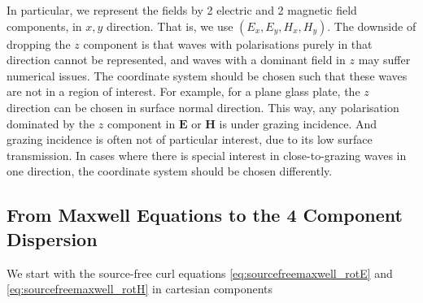 \documentclass[12pt,a4paper,twoside,openright,BCOR10mm,headsepline,titlepage,abstracton,chapterprefix,final]{scrreprt}
\newcommand\Vector[1]{{\mathbf{#1}}}
\newcommand\scalarEfield{E}
\newcommand\scalarHfield{H}
\newcommand\Efield{\Vector{\scalarEfield}}
\newcommand\Hfield{\Vector{\scalarHfield}}
\begin{document}
In particular, we represent the fields by 2 electric and 2 magnetic field components, in $x,y$ direction. 
That is, we use $(\scalarEfield_x, \scalarEfield_y, \scalarHfield_x, \scalarHfield_y)$. 
The downside of dropping the $z$ component is that waves with polarisations purely in that direction cannot be represented,
and waves with a dominant field in $z$ may suffer numerical issues.
The coordinate system should be chosen such that these waves are not in a region of interest. For example, for a plane glass plate, the $z$ direction can be chosen in surface normal direction. This way, any polarisation dominated by the $z$ component in $\Efield$ or $\Hfield$ is under grazing incidence. 
And grazing incidence is often not of particular interest, due to its low surface transmission.
In cases where there is special interest in close-to-grazing waves in one direction, the coordinate system should be chosen differently.

\subsection{From Maxwell Equations to the 4 Component Dispersion}
We start with the source-free curl equations \ref{eq:sourcefreemaxwell_rotE} and \ref{eq:sourcefreemaxwell_rotH} in cartesian components
\end{document}
